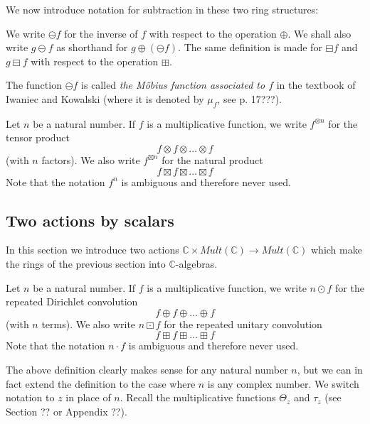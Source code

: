 \documentclass[a4paper]{article}
\begin{document}
We now introduce notation for subtraction in these two ring structures:

\begin{definition}
We write $\ominus f$ for the inverse of $f$ with respect to the operation $\oplus$. We shall also write $g \ominus f$ as shorthand for $g \oplus (\ominus f)$. The same definition is made for $\boxminus f$ and $g \boxminus f$ with respect to the operation $\boxplus$.
\end{definition}

\begin{remark}
The function $\ominus f$ is called \emph{the M{\"o}bius function associated to $f$} in the textbook of Iwaniec and Kowalski (where it is denoted by $\mu_f$, see p. 17???).
\end{remark}

\begin{definition}
Let $n$ be a natural number. If $f$ is a multiplicative function, we write $f^{\otimes n}$ for the tensor product 
$$   f \otimes f \otimes \ldots \otimes f  $$
(with $n$ factors). We also write $f^{\boxtimes n}$ for the natural product
$$   f \boxtimes f \boxtimes \ldots \boxtimes f  $$
Note that the notation $f^n$ is ambiguous and therefore never used.
\end{definition}



\subsection{Two actions by scalars}

In this section we introduce two actions $\mathbb{C} \times Mult(\mathbb{C}) \to Mult(\mathbb{C})$ which make the rings of the previous section into $\mathbb{C}$-algebras.

\begin{definition}
Let $n$ be a natural number. If $f$ is a multiplicative function, we write $n \odot f $ for the repeated Dirichlet convolution 
$$   f \oplus f \oplus \ldots \oplus f  $$
(with $n$ terms). We also write $n \boxdot f$ for the repeated unitary convolution
$$   f \boxplus f \boxplus \ldots \boxplus f  $$
Note that the notation $n \cdot f$ is ambiguous and therefore never used.
\end{definition}

The above definition clearly makes sense for any natural number $n$, but we can in fact extend the definition to the case where $n$ is any complex number. We switch notation to $z$ in place of $n$. Recall the multiplicative functions $\Theta_z$ and $\tau_z$ (see Section ?? or Appendix ??).
\end{document}
